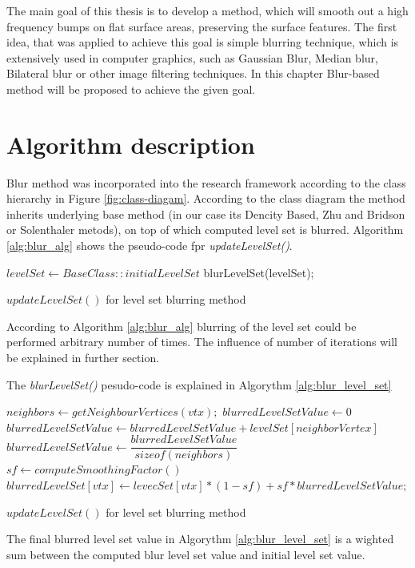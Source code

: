 The main goal of this thesis is to develop a method, which will smooth out a high frequency bumps on flat surface areas, preserving the surface features. The first idea, that was applied to achieve this goal is simple blurring technique, which is extensively used in computer graphics, such as Gaussian Blur, Median blur, Bilateral blur or other image filtering techniques. In this chapter Blur-based method will be proposed to achieve the given goal. 

\section{Algorithm description}
Blur method was incorporated into the research framework according to the class hierarchy in Figure \ref{fig:class-diagam}. According to the class diagram the method inherits underlying base method (in our case its Dencity Based, Zhu and Bridson or Solenthaler metods), on top of which computed level set is blurred.  Algorithm \ref{alg:blur_alg} shows the pseudo-code fpr \emph{updateLevelSet()}.
\begin{algorithm}[H]
	\begin{algorithmic}
		\State $levelSet \gets  BaseClass::initialLevelSet$
			\State blurLevelSet(levelSet);
		\EndFor
	\end{algorithmic}
	\caption{$updateLevelSet()$ for level set blurring method}
	\label{alg:blur_alg}
\end{algorithm}
According to Algorithm \ref{alg:blur_alg} blurring of the level set could be performed arbitrary number of times. The influence of number of iterations will be explained in further section.

The \emph{blurLevelSet()} pesudo-code is explained in Algorythm \ref{alg:blur_level_set}
\begin{algorithm}[H]
	\begin{algorithmic}
		\ForAll{$vtx \in MC\_CellDomain$}
			\State $neighbors \gets getNeighbourVertices(vtx);$
			\State $blurredLevelSetValue \gets 0$
			\ForAll{$nbVtx \in neighbors$}
				\State $blurredLevelSetValue\gets blurredLevelSetValue + levelSet[neighborVertex]$
			\EndFor
			\State $blurredLevelSetValue\gets\dfrac{blurredLevelSetValue}{sizeof(neighbors)}$
			\State $sf\gets computeSmoothingFactor()$
			\State $blurredLevelSet[vtx]\gets levecSet[vtx] * (1 - sf) + sf * blurredLevelSetValue;$
		\EndFor
	\end{algorithmic}
	\caption{$updateLevelSet()$ for level set blurring method}
	\label{alg:blur_level_set}
\end{algorithm}
The final blurred level set value in Algorythm \ref{alg:blur_level_set} is a wighted sum between the computed blur level set value and initial level set value.
